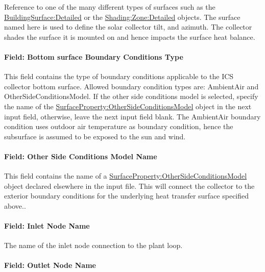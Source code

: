 Reference to one of the many different types of surfaces such as the \hyperref[buildingsurfacedetailed]{BuildingSurface:Detailed} or the \hyperref[shadingzonedetailed-000]{Shading:Zone:Detailed} objects. The surface named here is used to define the solar collector tilt, and azimuth. The collector shades the surface it is mounted on and hence impacts the surface heat balance.

\paragraph{Field: Bottom surface Boundary Conditions Type}\label{field-bottom-surface-boundary-conditions-type}

This field contains the type of boundary conditions applicable to the ICS collector bottom surface. Allowed boundary condition types are: AmbientAir and OtherSideConditionsModel. If the other side conditions model is selected, specify the name of the \hyperref[surfacepropertyothersideconditionsmodel]{SurfaceProperty:OtherSideConditionsModel} object in the next input field, otherwise, leave the next input field blank. The AmbientAir boundary condition uses outdoor air temperature as boundary condition, hence the subsurface is assumed to be exposed to the sun and wind.

\paragraph{Field: Other Side Conditions Model Name}\label{field-other-side-conditions-model-name}

This field contains the name of a \hyperref[surfacepropertyothersideconditionsmodel]{SurfaceProperty:OtherSideConditionsModel} object declared elsewhere in the input file. This will connect the collector to the exterior boundary conditions for the underlying heat transfer surface specified above..

\paragraph{Field: Inlet Node Name}\label{field-inlet-node-name-1-004}

The name of the inlet node connection to the plant loop.

\paragraph{Field: Outlet Node Name}\label{field-outlet-node-name-1-005}

